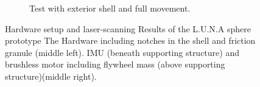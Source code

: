 \begin{figure}
\begin{subfigure}[b]{0.32\textwidth}
	\caption{Test with exterior shell and full movement.}
	\label{sec:experimentalResults:3DLaserScanning:fig:thirdpointcloud}
\end{subfigure}
\caption{Hardware setup and laser-scanning Results of the L.U.N.A sphere prototype The Hardware including notches in the shell and friction granule (middle left). IMU (beneath supporting structure) and brushless motor  including flywheel mass (above supporting structure)(middle right).}
\label{sec:TechnicalApproach:fig:setup}

\end{figure}